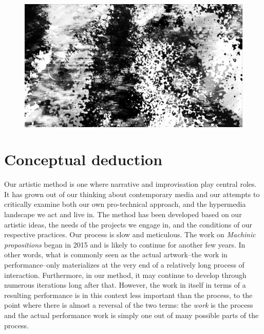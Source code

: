 \documentclass[11pt]{article}
\begin{document}
\begin{figure}\label{fig:impro-1}
  \centering
  \includegraphics[width=\linewidth]{img/final/Mongrel_double_vindow_feed_1pr_row_ELISK_monoC}
\end{figure}

\section*{Conceptual deduction}
\label{sec:conceptual-deduction}

Our artistic method is one where narrative and improvisation play central
roles. It has grown out of our thinking about contemporary media and
our attempts to critically examine both our own pro-technical
approach, and the hypermedia landscape we act and live in. The method has
been developed based on our artistic ideas, the needs of the projects
we engage in, and the conditions of our respective practices. Our process is slow
and meticulous. The work on \emph{Machinic propositions} began in 2015
and is likely to continue for another few years. In other words, what
is commonly seen as the
actual artwork--the work in performance--only materializes at the very end of a relatively long
process of interaction. Furthermore, in our method, it may continue to develop
through numerous iterations long after that. However, the work in itself in terms of a
resulting performance is in this
context less important than the process, to the point where there is
almost a reversal of the two terms: the \emph{work} is the process and the
actual performance work is simply one out of many possible parts of the process. 
\end{document}
